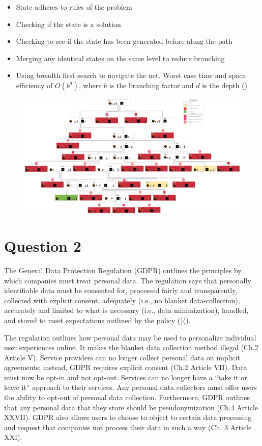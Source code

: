 \documentclass[
	letterpaper, %
]{jdf}
\begin{document}
\begin{itemize}
	\item State adheres to rules of the problem
	\item Checking if the state is a solution
	\item Checking to see if the state has been generated before along the path
	\item Merging any identical states on the same level to reduce branching
	\item Using breadth first search to navigate the net. Worst case time and space efficiency of $O(\textit{b}^d)$, where $\textit{b}$ is the branching factor and $\textit{d}$ is the depth (\cite{korf_artificial_1999})
\end{itemize}

\begin{figure}[hbtp]
	\centering
	\includegraphics[width=\paperwidth,height=0.80\paperheight]{Figures/HW1 diagram - Page 1.png}
	\label{fig2:net}
	\caption{}
\end{figure}

\section{Question 2}
The General Data Protection Regulation (GDPR) outlines the principles by which companies must treat personal data. The regulation says that personally identifiable data must be consented for, processed fairly and transparently, collected with explicit consent, adequately (i.e., no blanket data-collection), accurately and limited to what is necessary (i.e., data minimization), handled, and stored to meet expectations outlined by the policy (\cite{european_parliament_general_2016})(\cite{davies_personalization_2018}). 

The regulation outlines how personal data may be used to personalize individual user experiences online. It makes the blanket data collection method illegal (Ch.2 Article V). Service providers can no longer collect personal data on implicit agreements; instead, GDPR requires explicit consent (Ch.2 Article VII). Data must now be opt-in and not opt-out. Services can no longer have a “take it or leave it” approach to their services. Any personal data collectors must offer users the ability to opt-out of personal data collection. Furthermore, GDPR outlines that any personal data that they store should be pseudonymization (Ch.4 Article XXVII). GDPR also allows users to choose to object to certain data processing and request that companies not process their data in such a way (Ch. 3 Article XXI).
\end{document}

